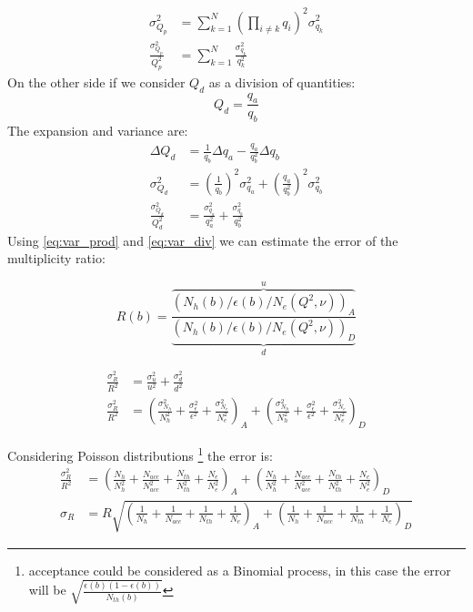\begin{align}
\sigma_{Q_p}^2 &= \sum_{k=1}^N (\prod_{i\neq k}q_i)^2 \sigma_{q_k}^2 \\
\frac{\sigma_{Q_p}^2}{Q_p^2} &= \sum_{k=1}^N \frac{\sigma_{q_k}^2}{q_k^2} \label{eq:var_prod}
\end{align}
%
On the other side if we consider $Q_d$ as a division of quantities:
%
\begin{equation}
Q_d = \frac{q_a}{q_b}
\end{equation}
The expansion and variance are:
\begin{align}
\Delta Q_d &= \frac{1}{q_b}\Delta q_a - \frac{q_a}{q_b^2}\Delta q_b\\
\sigma_{Q_d}^2 &= (\frac{1}{q_b})^2\sigma_{q_a}^2 + (\frac{q_a}{q_b^2})^2\sigma_{q_b}^2\\
\frac{\sigma_{Q_d}^2}{Q_d^2} &= \frac{\sigma_{q_a}^2}{q_a^2} + \frac{\sigma_{q_b}^2}{q_b^2} \label{eq:var_div}
\end{align}
%
Using \eqref{eq:var_prod} and \eqref{eq:var_div} we can estimate the error of the multiplicity ratio:

\begin{equation}
R(b) = \frac{\overbrace{\left(N_h(b)/\epsilon(b)/N_e(Q^2,\nu)\right)_A}^u} {\underbrace{\left(N_h(b)/\epsilon(b)/N_e(Q^2,\nu)\right)_D}_d}
 \label{eq:error_MR}
\end{equation}

\begin{align}
\frac{\sigma_R^2}{R^2} &= \frac{\sigma_u^2}{u^2} + \frac{\sigma_d^2}{d^2}\\
\frac{\sigma_R^2}{R^2} &= \left(\frac{\sigma_{N_h}^2}{N_h^2} + \frac{\sigma_{\epsilon}^2}{\epsilon^2} +\frac{\sigma_{N_e}^2}{N_e^2}\right)_A + \left(\frac{\sigma_{N_h}^2}{N_h^2} + \frac{\sigma_{\epsilon}^2}{\epsilon^2} +\frac{\sigma_{N_e}^2}{N_e^2}\right)_D
\end{align}

Considering Poisson distributions \footnote{acceptance could be considered as a Binomial process, in this case the error will be $\sqrt{\frac{\epsilon(b)(1-\epsilon(b))}{N_{th}(b)}}$ } the error is:
\begin{align}
\frac{\sigma_R^2}{R^2} &= \left(\frac{N_h}{N_h^2} + \frac{N_{acc}}{N_{acc}^2} +\frac{N_{th}}{N_{th}^2} + \frac{N_e}{N_e^2}\right)_A + \left(\frac{N_h}{N_h^2} + \frac{N_{acc}}{N_{acc}^2} +\frac{N_{th}}{N_{th}^2} + \frac{N_e}{N_e^2}\right)_D \\
\sigma_R &= R\sqrt{ \left(\frac{1}{N_h} + \frac{1}{N_{acc}} +\frac{1}{N_{th}} + \frac{1}{N_e}\right)_A + \left(\frac{1}{N_h} + \frac{1}{N_{acc}} +\frac{1}{N_{th}} + \frac{1}{N_e}\right)_D}
\end{align}

